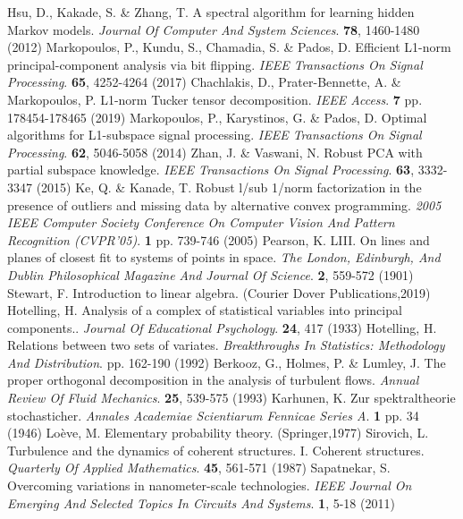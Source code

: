 \documentclass[sn-mathphys-num]{sn-jnl}%
\begin{document}
\begin{thebibliography}{000}
Hsu, D., Kakade, S. \& Zhang, T. A spectral algorithm for learning hidden Markov models. {\em Journal Of Computer And System Sciences}. \textbf{78}, 1460-1480 (2012)
Markopoulos, P., Kundu, S., Chamadia, S. \& Pados, D. Efficient L1-norm principal-component analysis via bit flipping. {\em IEEE Transactions On Signal Processing}. \textbf{65}, 4252-4264 (2017)
Chachlakis, D., Prater-Bennette, A. \& Markopoulos, P. L1-norm Tucker tensor decomposition. {\em IEEE Access}. \textbf{7} pp. 178454-178465 (2019)
Markopoulos, P., Karystinos, G. \& Pados, D. Optimal algorithms for L1-subspace signal processing. {\em IEEE Transactions On Signal Processing}. \textbf{62}, 5046-5058 (2014)
Zhan, J. \& Vaswani, N. Robust PCA with partial subspace knowledge. {\em IEEE Transactions On Signal Processing}. \textbf{63}, 3332-3347 (2015)
Ke, Q. \& Kanade, T. Robust l/sub 1/norm factorization in the presence of outliers and missing data by alternative convex programming. {\em 2005 IEEE Computer Society Conference On Computer Vision And Pattern Recognition (CVPR'05)}. \textbf{1} pp. 739-746 (2005)
Pearson, K. LIII. On lines and planes of closest fit to systems of points in space. {\em The London, Edinburgh, And Dublin Philosophical Magazine And Journal Of Science}. \textbf{2}, 559-572 (1901)
Stewart, F. Introduction to linear algebra. (Courier Dover Publications,2019)
Hotelling, H. Analysis of a complex of statistical variables into principal components.. {\em Journal Of Educational Psychology}. \textbf{24}, 417 (1933)
Hotelling, H. Relations between two sets of variates. {\em Breakthroughs In Statistics: Methodology And Distribution}. pp. 162-190 (1992)
Berkooz, G., Holmes, P. \& Lumley, J. The proper orthogonal decomposition in the analysis of turbulent flows. {\em Annual Review Of Fluid Mechanics}. \textbf{25}, 539-575 (1993)
Karhunen, K. Zur spektraltheorie stochasticher. {\em Annales Academiae Scientiarum Fennicae Series A}. \textbf{1} pp. 34 (1946)
Loève, M. Elementary probability theory. (Springer,1977)
Sirovich, L. Turbulence and the dynamics of coherent structures. I. Coherent structures. {\em Quarterly Of Applied Mathematics}. \textbf{45}, 561-571 (1987)
Sapatnekar, S. Overcoming variations in nanometer-scale technologies. {\em IEEE Journal On Emerging And Selected Topics In Circuits And Systems}. \textbf{1}, 5-18 (2011)

\end{thebibliography}
\end{document}
